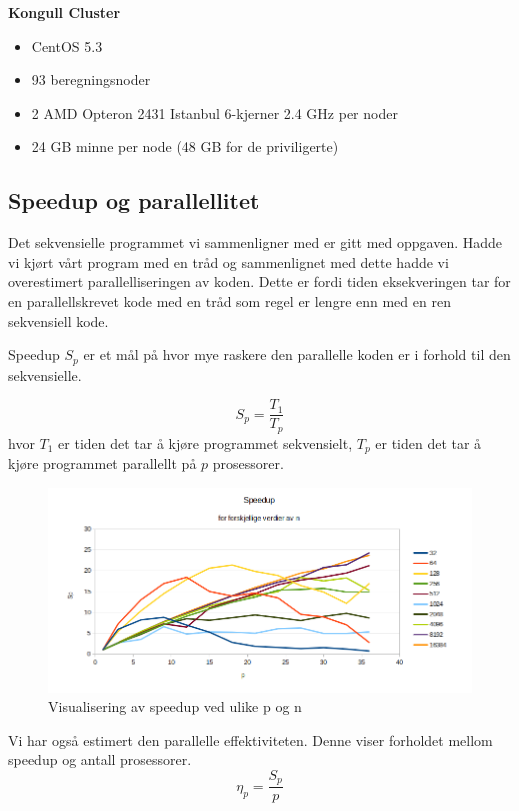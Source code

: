 \documentclass[11pt,norsk,a4paper]{article}
\begin{document}
\begin{shaded}
\textbf{Kongull Cluster}\\
\begin{itemize}
\item{CentOS 5.3}
\item{93 beregningsnoder}
\item{2 AMD Opteron 2431 Istanbul 6-kjerner 2.4 GHz per noder}
\item{24 GB minne per node (48 GB for de priviligerte)}
\end{itemize}
\end{shaded}

\subsection{Speedup og parallellitet}
Det sekvensielle programmet vi sammenligner med er gitt med oppgaven. Hadde vi kjørt vårt program med en tråd og sammenlignet med dette hadde vi overestimert parallelliseringen av koden. Dette er fordi tiden eksekveringen tar for en parallellskrevet kode med en tråd som regel er lengre enn med en ren sekvensiell kode.

Speedup $S_p$ er et mål på hvor mye raskere den parallelle koden er i forhold til den sekvensielle.

$$ S_p = \frac{T_1}{T_p}$$
hvor $T_1$ er tiden det tar å kjøre programmet sekvensielt, $T_p$ er tiden det tar å kjøre programmet parallellt på $p$ prosessorer.

\begin{figure}[h]
\centering
\includegraphics[scale=0.425]{plot_speedup.png}
\caption{Visualisering av speedup ved ulike p og n}
\end{figure}

Vi har også estimert den parallelle effektiviteten. Denne viser forholdet mellom speedup og antall prosessorer.
$$ \eta_p = \frac{S_p}{p}$$
\end{document}
